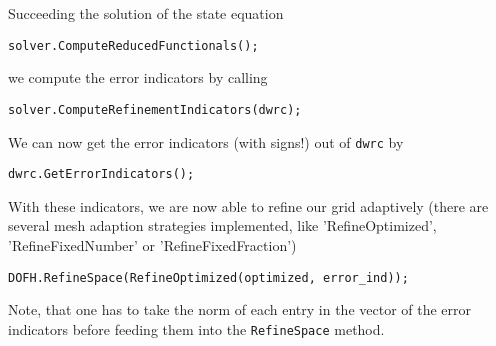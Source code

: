 Succeeding the solution of the state equation 
\begin{verbatim}
solver.ComputeReducedFunctionals(); 
\end{verbatim}
we compute the error indicators by calling 
\begin{verbatim}
solver.ComputeRefinementIndicators(dwrc);
\end{verbatim}
We can now get the error indicators (with signs!) out of \texttt{dwrc} by 
\begin{verbatim}
dwrc.GetErrorIndicators();
\end{verbatim}
With these indicators, we are now able to refine our grid adaptively (there are several mesh adaption strategies implemented, like 'RefineOptimized', 'RefineFixedNumber' or 'RefineFixedFraction')
\begin{verbatim}
DOFH.RefineSpace(RefineOptimized(optimized, error_ind));
\end{verbatim}
Note, that one has to take the norm of each entry in the vector of the error indicators before feeding them into the \texttt{RefineSpace} method.
